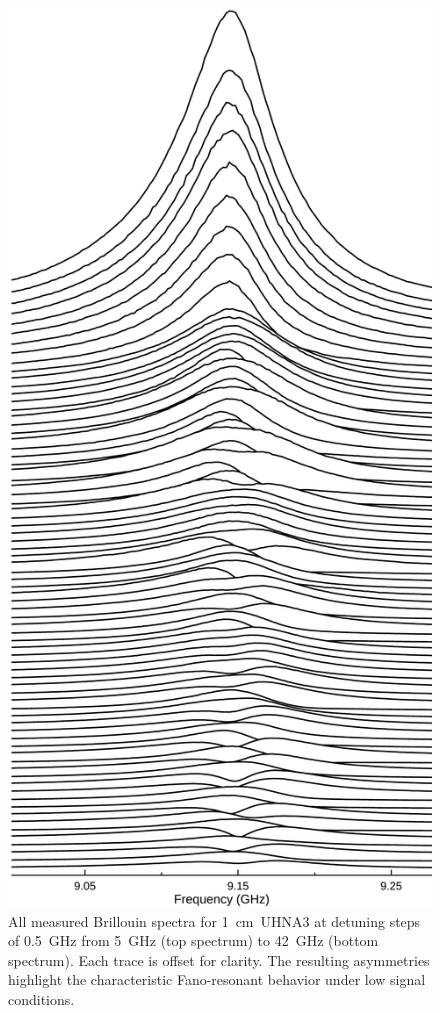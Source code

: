 \begin{figure}[ht]
\centering
\includegraphics[height=0.90\textheight]{figs/3-CoBS/JoyDivisionCoBSUHNA3.pdf}
\caption{All measured Brillouin spectra for \SI{1}{\centi\meter}~\ac{UHNA3} at detuning steps of \SI{0.5}{\giga\hertz} from \SI{5}{\giga\hertz} (top spectrum) to \SI{42}{\giga\hertz} (bottom spectrum). Each trace is offset for clarity. The resulting asymmetries highlight the characteristic Fano-resonant behavior under low signal conditions.}
\label{fig:Joy Division UHNA3}
\end{figure}

